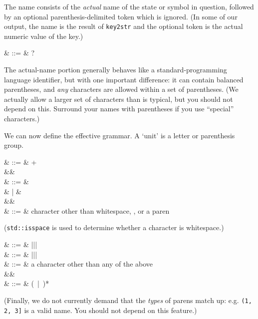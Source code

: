 The name consists of the \textsl{actual} name of the state or symbol
in question, followed by an optional parenthesis-delimited token which
is ignored. (In some of our output, the name is the result of
\texttt{key2str} and the optional token is the actual numeric value of
the key.)

\begin{grammar}
   & ::= &  \cfgsp  {}?
\end{grammar}

The actual-name portion generally behaves like a standard-programming
language identifier, but with one important difference: it can contain
balanced parentheses, and \textsl{any} characters are allowed within a
set of parentheses. (We actually allow a larger set of characters than
is typical, but you should not depend on this. Surround your names
with parentheses if you use ``special'' characters.)

We can now define the effective grammar. A `unit' is a letter or
parenthesis group.

\begin{grammar}
   & ::= &  + \\
&& \\
   & ::= &   \\
                 &   | &   \\
&& \\
  & ::= &  \textrm{character other than whitespace, \term{,}, or a paren}
\end{grammar}

(\texttt{std::isspace} is used to determine whether a character is
  whitespace.)

\begin{grammar}
    & ::= &  \term{(}\cfgsp |\cfgsp \term{\{}\cfgsp |\cfgsp \term{[}\cfgsp |\cfgsp \term{$<$} \\
   & ::= &  \term{)}\cfgsp |\cfgsp \term{\}}\cfgsp |\cfgsp \term{]}\cfgsp |\cfgsp \term{$>$} \\
   & ::= &  \textrm{a character other than any of the above} \\
&& \\
  & ::= &  \cfgsp  (\ |\ )*\cfgsp  {}
\end{grammar}

(Finally, we do not currently demand that the \textsl{types} of parens
  match up: e.g. \texttt{(1, 2, 3]} is a valid name. You should not
    depend on this feature.)
